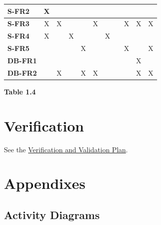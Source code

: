 \documentclass{article}
\begin{document}
\begin{table}
\begin{adjustwidth}{-1in}{0in}
{\begin{tabular}{c|c|c|c|c|c|c|c|c|c|c|}
\multicolumn{1}{|l|}{\textbf{S-FR2}} & X & & & & & & & & & \\ \hline
\multicolumn{1}{|l|}{\textbf{S-FR3}} & X & X & & & X & & & X & X & X \\ \hline
\multicolumn{1}{|l|}{\textbf{S-FR4}} & X & & X & & & X & & & & \\ \hline
\multicolumn{1}{|l|}{\textbf{S-FR5}} & & & & X & & & & X & & X \\ \hline
\multicolumn{1}{|l|}{\textbf{DB-FR1}} & & & & & & & & & X & \\ \hline
\multicolumn{1}{|l|}{\textbf{DB-FR2}} & & X & & X & X & & & & X & X \\ \hline
\end{tabular}

}
\begin{center}
    \textbf{Table 1.4}
\end{center}
\end{adjustwidth}
\end{table}

\newpage

\section{Verification}

See the \href{https://github.com/russellrd/realm/blob/main/docs/VnVPlan/VnVPlan.pdf}{Verification and Validation Plan}.

\section{Appendixes}

\subsection{Activity Diagrams}
\label{sub:activity_diagrams}
\end{document}

